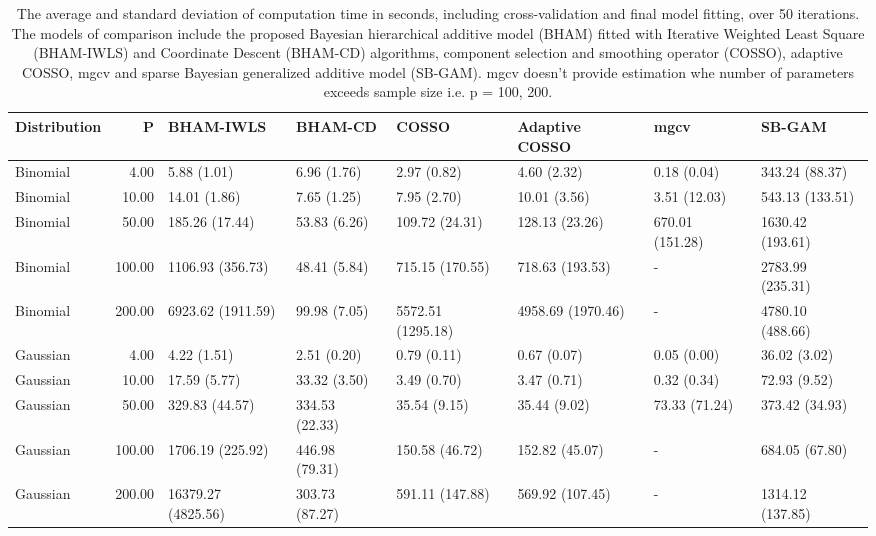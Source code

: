 \documentclass[AMA,STIX1COL,]{WileyNJD-v2}
\begin{document}
\newpage

\begin{sidewaystable}[!h]
\centering
\begin{tabular}{lrllllll}
  \hline
Distribution & P & BHAM-IWLS & BHAM-CD & COSSO & Adaptive COSSO & mgcv & SB-GAM \\ 
  \hline
Binomial & 4.00 & 5.88 (1.01) & 6.96 (1.76) & 2.97 (0.82) & 4.60 (2.32) & 0.18 (0.04) & 343.24 (88.37) \\ 
  Binomial & 10.00 & 14.01 (1.86) & 7.65 (1.25) & 7.95 (2.70) & 10.01 (3.56) & 3.51 (12.03) & 543.13 (133.51) \\ 
  Binomial & 50.00 & 185.26 (17.44) & 53.83 (6.26) & 109.72 (24.31) & 128.13 (23.26) & 670.01 (151.28) & 1630.42 (193.61) \\ 
  Binomial & 100.00 & 1106.93 (356.73) & 48.41 (5.84) & 715.15 (170.55) & 718.63 (193.53) & - & 2783.99 (235.31) \\ 
  Binomial & 200.00 & 6923.62 (1911.59) & 99.98 (7.05) & 5572.51 (1295.18) & 4958.69 (1970.46) & - & 4780.10 (488.66) \\ 
  Gaussian & 4.00 & 4.22 (1.51) & 2.51 (0.20) & 0.79 (0.11) & 0.67 (0.07) & 0.05 (0.00) & 36.02 (3.02) \\ 
  Gaussian & 10.00 & 17.59 (5.77) & 33.32 (3.50) & 3.49 (0.70) & 3.47 (0.71) & 0.32 (0.34) & 72.93 (9.52) \\ 
  Gaussian & 50.00 & 329.83 (44.57) & 334.53 (22.33) & 35.54 (9.15) & 35.44 (9.02) & 73.33 (71.24) & 373.42 (34.93) \\ 
  Gaussian & 100.00 & 1706.19 (225.92) & 446.98 (79.31) & 150.58 (46.72) & 152.82 (45.07) & - & 684.05 (67.80) \\ 
  Gaussian & 200.00 & 16379.27 (4825.56) & 303.73 (87.27) & 591.11 (147.88) & 569.92 (107.45) & - & 1314.12 (137.85) \\ 
   \hline
\end{tabular}
\caption{The average and standard deviation of computation time in seconds, including cross-validation and final model fitting, over 50 iterations. The models of comparison include the proposed Bayesian hierarchical additive model (BHAM) fitted with Iterative Weighted Least Square (BHAM-IWLS) and Coordinate Descent (BHAM-CD) algorithms, component selection and smoothing operator (COSSO), adaptive COSSO, mgcv and sparse Bayesian generalized additive model (SB-GAM). mgcv doesn't provide estimation whe number of parameters exceeds sample size i.e. p = 100, 200.} 
\label{tab:time_sim}
\end{sidewaystable}
\end{document}
